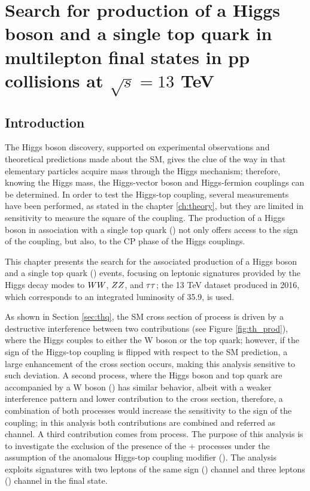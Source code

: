 \chapter{Search for production of a Higgs boson and a single top quark in multilepton final states in pp collisions at $\sqrt{s}=13$ TeV}\label{ch:analysis}

\section{Introduction}\label{sec:Intro_analysis}

The Higgs boson discovery, supported on experimental observations and theoretical predictions made about the SM, gives the clue of the way in that elementary particles acquire mass through the Higgs mechanism; therefore, knowing the Higgs mass, the Higgs-vector boson and Higgs-fermion couplings can be determined. In order to test the Higgs-top coupling, several measurements have been performed, as stated in the chapter \ref{ch:theory}, but they are limited in sensitivity to measure the square of the coupling. The production of a Higgs boson in association with a single top quark (\tH) not only offers access to the sign of the coupling, but also, to the CP phase of the Higgs couplings.

This chapter presents the search for the associated production of a Higgs boson and a single top quark (\tHq) events, focusing on leptonic signatures provided by the Higgs decay modes to $WW$, $ZZ$, and $\tau\tau$; the 13 TeV dataset produced in 2016, which corresponds to an integrated luminosity of 35.9\fbinv, is used.

As shown in Section \ref{sec:thq}, the SM cross section of \tHq process is driven by a destructive interference between two contributions (see Figure \ref{fig:th_prod}), where the Higgs couples to either the W boson or the top quark; however, if the sign of the Higgs-top coupling is flipped with respect to the SM prediction, a large enhancement of the cross section occurs, making this analysis sensitive to such deviation. A second process, where the Higgs boson and top quark are accompanied by a W boson (\tHW) has similar behavior, albeit with a weaker interference pattern and lower contribution to the cross section, therefore, a combination of both processes would increase the sensitivity to the sign of the coupling; in this analysis both contributions are combined and referred as \tH channel. A third contribution comes from \ttH process. The purpose of this analysis is to investigate the exclusion of the presence of the \tH + \ttH processes under the assumption of the anomalous Higgs-top coupling modifier (). The analysis exploits signatures with two leptons of the same sign () channel and three leptons () channel in the final state.

